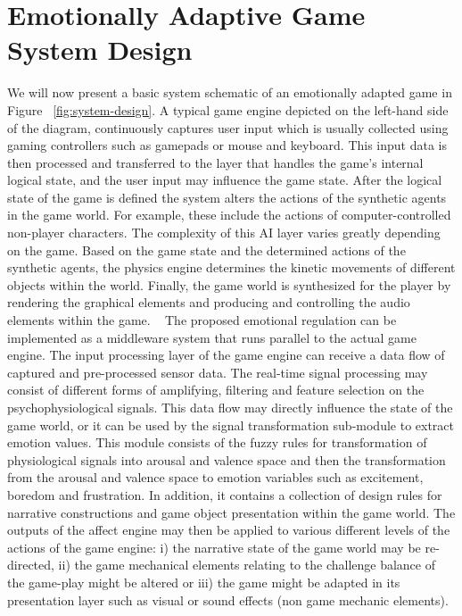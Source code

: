 \section{Emotionally Adaptive Game System Design}

We will now present a basic system schematic of an emotionally adapted game in Figure ~\ref{fig:system-design}. A typical game engine depicted on the left-hand side of the diagram, continuously captures user input which is usually collected using gaming controllers such as gamepads or mouse and keyboard. %
This input data is then processed and transferred to the layer that handles the game's internal logical state, and the user input may influence the game state. After the logical state of the game is defined the system alters the actions of the synthetic agents in the game world. For example, these include the actions of computer-controlled non-player characters. The complexity of this AI layer varies greatly depending on the game. Based on the game state and the determined actions of the synthetic agents, the physics engine determines the kinetic movements of different objects within the world. Finally, the game world is synthesized for the player by rendering the graphical elements and producing and controlling the audio elements within the game. ~\cite{saari2005emotional} The proposed emotional regulation can be implemented as a middleware system that runs parallel to the actual game engine. The input processing layer of the game engine can receive a data flow of captured and pre-processed sensor data. The real-time signal processing may consist of different forms of amplifying, filtering and feature selection on the psychophysiological signals. This data flow may directly influence the state of the game world, or it can be used by the signal transformation sub-module to extract emotion values. This module consists of the fuzzy rules for transformation of physiological signals into arousal and valence space and then the transformation from the arousal and valence space to emotion variables such as excitement, boredom and frustration. In addition, it contains a collection of design rules for narrative constructions and game object presentation within the game world. The outputs of the affect engine may then be applied to various different levels of the actions of the game engine: i) the narrative state of the game world may be re-directed, ii) the game mechanical elements relating to the challenge balance of the game-play might be altered or iii) the game might be adapted in its presentation layer such as visual or sound effects (non game mechanic elements).

